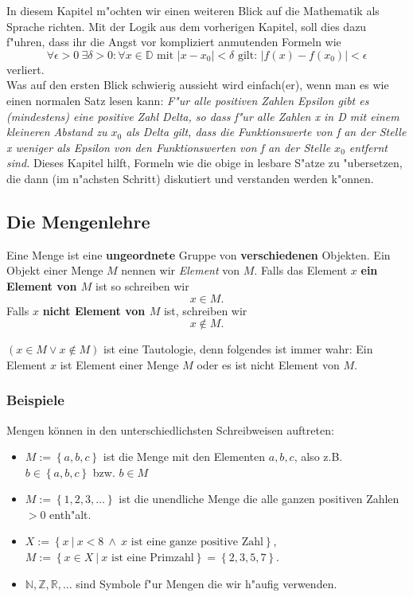 In diesem Kapitel m"ochten wir einen weiteren Blick auf die Mathematik als Sprache richten. Mit der Logik aus dem vorherigen Kapitel, soll dies dazu f"uhren, dass ihr die Angst vor kompliziert anmutenden Formeln wie
\begin{equation*}
\forall \epsilon > 0 \ \exists \delta > 0 : \forall x \in \mathbb{D} \text{ mit } \left|x - x_0 \right| < \delta \text{ gilt: } \left| f(x) - f(x_0) \right| < \epsilon 
\end{equation*}
verliert.\\
Was auf den ersten Blick schwierig aussieht wird einfach(er), wenn man es wie einen normalen Satz lesen kann:
\textit{
F"ur alle positiven Zahlen Epsilon gibt es (mindestens) eine positive Zahl Delta, so dass f"ur alle Zahlen x in D mit einem kleineren Abstand zu $x_0$ als Delta gilt, dass die Funktionswerte von f an der Stelle x weniger als Epsilon von den Funktionswerten von f an der Stelle $x_0$ entfernt sind.
}
Dieses Kapitel hilft, Formeln wie die obige in lesbare S"atze zu "ubersetzen, die dann (im n"achsten Schritt) diskutiert und verstanden werden k"onnen.

\subsection{Die Mengenlehre}
Eine Menge ist eine \textbf{ungeordnete} Gruppe von \textbf{verschiedenen} Objekten. Ein Objekt einer Menge $M$ nennen wir \textit{Element} von $M$. Falls das Element $x$ \textbf{ein Element von $M$} ist so schreiben wir 
\begin{equation*}
x \in M.
\end{equation*}
Falls $x$ \textbf{nicht Element von $M$} ist, schreiben wir
\begin{equation*}
x \notin M.
\end{equation*}

\begin{warning}
	$(x \in M \lor x \notin M)$ ist eine Tautologie, denn folgendes ist immer wahr: Ein Element $x$ ist Element einer Menge $M$ oder es ist nicht Element von $M$.
\end{warning}

\subsubsection{Beispiele}
Mengen können in den unterschiedlichsten Schreibweisen auftreten:
\begin{itemize}
\item $M := \left\{a, b, c\right\}$ ist die Menge mit den Elementen $a,b,c$, also z.B. $b \in  \left\{a, b, c\right\}$ bzw. $b \in M$
\item $M := \left\{1, 2, 3, \ldots \right\}$ ist die unendliche Menge die alle ganzen positiven Zahlen $> 0$ enth"alt.
\item $X:= \left\{x \ | \ x < 8 \ \land \ x \text{ ist eine ganze positive Zahl} \right\}$,\\$M := \left\{x \in X \ | \ x \text{ ist eine Primzahl} \right\} = \left\{2, 3, 5, 7\right\}$.
\item $\mathbb{N}, \mathbb{Z}, \mathbb{R}, \ldots$ sind Symbole f"ur Mengen die wir h"aufig verwenden.
\end{itemize}

